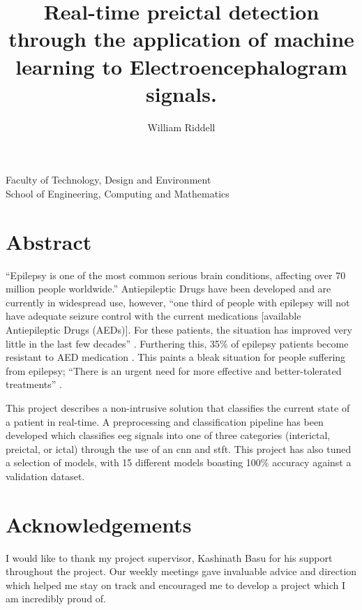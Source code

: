 \documentclass[12pt]{article}
\title{Real-time preictal detection through the application of machine learning to Electroencephalogram signals.}
\author{William Riddell}
\date{\parbox{\linewidth}{\centering
\vspace{0.5cm}
\today\endgraf\bigskip\vspace{0.5cm} 
Word Count: 10,000 \\ \vspace{0.5cm}  
Supervised by Kashinath Basu}}
\begin{document}


\maketitle

\vfill 
\begin{center} 
Faculty of Technology, Design and Environment\\
School of Engineering, Computing and Mathematics
\end{center}
\pagebreak
\tableofcontents
\listoffigures
\listoftables
\printglossary[type=\acronymtype]
\pagebreak


\section{Abstract}

“Epilepsy is one of the most common serious brain conditions, affecting over 70 million people worldwide.” \cite{thijs2019epilepsy} Antiepileptic Drugs have been developed and are currently in widespread use, however, “one third of people with epilepsy will not have adequate seizure control with the current medications [available Antiepileptic Drugs (AEDs)]. For these patients, the situation has improved very little in the last few decades” \cite{galanopoulou2012identification}. Furthering this, 35\% of epilepsy patients become resistant to AED medication \cite{moghim2014predicting}. This paints a bleak situation for people suffering from epilepsy; “There is an urgent need for more effective and better-tolerated treatments'' \cite{loscher2011modern}.

This project describes a non-intrusive solution that classifies the current state of a patient in real-time. A preprocessing and classification pipeline has been developed which classifies \acrfull{eeg} signals into one of three categories (interictal, preictal, or ictal) through the use of an \acrfull{cnn} and \acrfull{stft}. This project has also tuned a selection of models, with 15 different models boasting 100\% accuracy against a validation dataset.




\section{Acknowledgements}

I would like to thank my project supervisor, Kashinath Basu for his support throughout the project. Our weekly meetings gave invaluable advice and direction which helped me stay on track and encouraged me to develop a project which I am incredibly proud of. 
\end{document}

